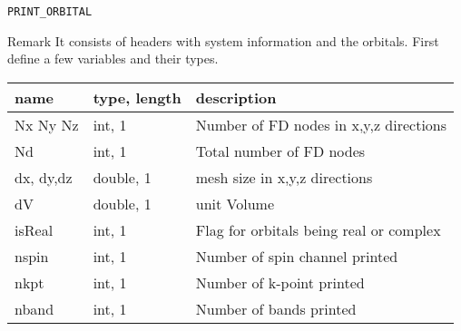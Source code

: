 \begin{frame}[allowframebreaks]{\texttt{PRINT\_ORBITAL}}
\begin{block}{Remark}
It consists of headers with system information and the orbitals. 
First define a few variables and their types. 
\begin{table}[]
\begin{tabular}{|m{1.8cm}|m{2cm}|m{6.3cm}|}
\hline
name         & type, length       & description                                                                                                   \\ \hline
Nx Ny Nz     & int, 1             & Number of FD nodes in x,y,z directions                                                                        \\ \hline
Nd           & int, 1             & Total number of FD nodes                                                                                      \\ \hline
dx, dy,dz     & double, 1         & mesh size in x,y,z directions
                    \\ \hline
dV           & double, 1          & unit Volume                                                                                                   \\ \hline
isReal       & int, 1             & Flag for orbitals being real or complex                                                                       \\ \hline
nspin        & int, 1             & Number of spin channel printed                                                                                \\ \hline
nkpt         & int, 1             & Number of k-point printed                                                                                     \\ \hline
nband        & int, 1             & Number of bands printed   
                    \\ \hline
\end{tabular}
\end{table}
\end{block}


\end{frame}
